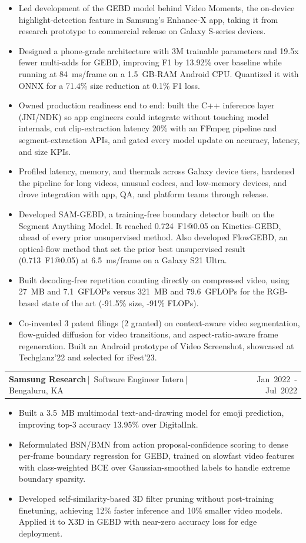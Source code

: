 \documentclass[letterpaper]{article}
\makeatletter
\newcommand{\job}[4]{\par\vspace{1.25pt}\noindent
\begin{tabularx}{\linewidth}{@{}>{\RaggedRight\arraybackslash}X@{\hspace{8pt}}r@{}}
\textbf{#1}\,|\, #2\,|\, #3 & \mbox{#4}
\end{tabularx}\par}
\makeatother
\begin{document}
\begin{itemize}
\item Led development of the GEBD model behind Video Moments, the on-device highlight-detection feature in Samsung's Enhance-X app, taking it from research prototype to commercial release on Galaxy S-series devices.
\item Designed a phone-grade architecture with 3M trainable parameters and 19.5x fewer multi-adds for GEBD, improving F1 by 13.92\% over baseline while running at 84~ms/frame on a 1.5~GB-RAM Android CPU. Quantized it with ONNX for a 71.4\% size reduction at 0.1\% F1 loss.
\item Owned production readiness end to end: built the C++ inference layer (JNI/NDK) so app engineers could integrate without touching model internals, cut clip-extraction latency 20\% with an FFmpeg pipeline and segment-extraction APIs, and gated every model update on accuracy, latency, and size KPIs. 
\item Profiled latency, memory, and thermals across Galaxy device tiers, hardened the pipeline for long videos, unusual codecs, and low-memory devices, and drove integration with app, QA, and platform teams through release.
\item Developed SAM-GEBD, a training-free boundary detector built on the Segment Anything Model. It reached 0.724~F1@0.05 on Kinetics-GEBD, ahead of every prior unsupervised method. Also developed FlowGEBD, an optical-flow method that set the prior best unsupervised result (0.713~F1@0.05) at 6.5~ms/frame on a Galaxy S21 Ultra.
\item Built decoding-free repetition counting directly on compressed video, using 27~MB and 7.1~GFLOPs versus 321~MB and 79.6~GFLOPs for the RGB-based state of the art (-91.5\% size, -91\% FLOPs).
\item Co-invented 3 patent filings (2 granted) on context-aware video segmentation, flow-guided diffusion for video transitions, and aspect-ratio-aware frame regeneration. Built an Android prototype of Video Screenshot, showcased at Techglanz'22 and selected for iFest'23.
\end{itemize}
\job{Samsung Research}{Software Engineer Intern}{Bengaluru, KA}{Jan 2022 - Jul 2022}
\begin{itemize}
\item Built a 3.5~MB multimodal text-and-drawing model for emoji prediction, improving top-3 accuracy 13.95\% over DigitalInk.
\item Reformulated BSN/BMN from action proposal-confidence scoring to dense per-frame boundary regression for GEBD, trained on slowfast video features with class-weighted BCE over Gaussian-smoothed labels to handle extreme boundary sparsity.
\item Developed self-similarity-based 3D filter pruning without post-training finetuning, achieving 12\% faster inference and 10\% smaller video models. Applied it to X3D in GEBD with near-zero accuracy loss for edge deployment.
\end{itemize}
\end{document}
